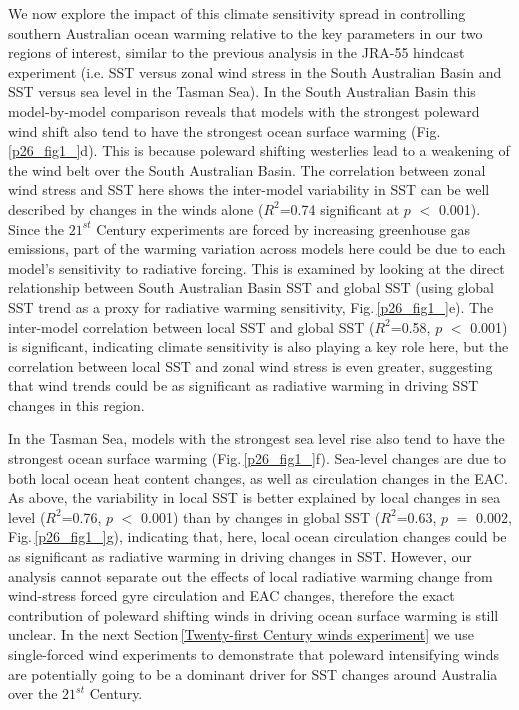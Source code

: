 \documentclass[draft,linenumbers]{agujournal2018}
\begin{document}
We now explore the impact of this climate sensitivity spread in controlling southern Australian ocean warming relative to the key parameters in our two regions of interest, similar to the previous analysis in the JRA-55 hindcast experiment (i.e. SST versus zonal wind stress in the South Australian Basin and SST versus sea level in the Tasman Sea). In the South Australian Basin this model-by-model comparison reveals that models with the strongest poleward wind shift also tend to have the strongest ocean surface warming (Fig.\,\ref{p26_fig1_}d). This is because poleward shifting westerlies lead to a weakening of the wind belt over the South Australian Basin. The correlation between zonal wind stress and SST here shows the inter-model variability in SST can be well described by changes in the winds alone ($R^2$=0.74 significant at $p$ $<$ 0.001). Since the $21^{st}$ Century experiments are forced by increasing greenhouse gas emissions, part of the warming variation across models here could be due to each model's sensitivity to radiative forcing. This is examined by looking at the direct relationship between South Australian Basin SST and global SST (using global SST trend as a proxy for radiative warming sensitivity, Fig.\,\ref{p26_fig1_}e). The inter-model correlation between local SST and global SST ($R^2$=0.58, $p$ $<$ 0.001) is significant, indicating climate sensitivity is also playing a key role here, but the correlation between local SST and zonal wind stress is even greater, suggesting that wind trends could be as significant as radiative warming in driving SST changes in this region.

In the Tasman Sea, models with the strongest sea level rise also tend to have the strongest ocean surface warming (Fig.\,\ref{p26_fig1_}f). Sea-level changes are due to both local ocean heat content changes, as well as circulation changes in the EAC. As above, the variability in local SST is better explained by local changes in sea level ($R^2$=0.76, $p$ $<$ 0.001) than by changes in global SST ($R^2$=0.63, $p$ $=$ 0.002, Fig.\,\ref{p26_fig1_}g), indicating that, here, local ocean circulation changes could be as significant as radiative warming in driving changes in SST. However, our analysis cannot separate out the effects of local radiative warming change from wind-stress forced gyre circulation and EAC changes, therefore the exact contribution of poleward shifting winds in driving ocean surface warming is still unclear. In the next Section\,\ref{Twenty-first Century winds experiment} we use single-forced wind experiments to demonstrate that poleward intensifying winds are potentially going to be a dominant driver for SST changes around Australia over the $21^{st}$ Century.
\end{document}
